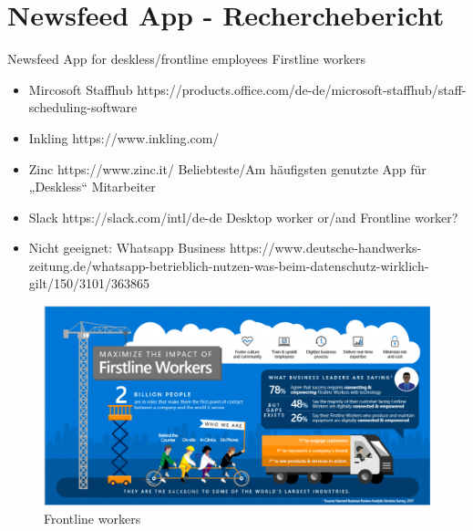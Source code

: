 \section{Newsfeed App - Recherchebericht}
\label{section:realisation:newsfeed_app}


Newsfeed App for deskless/frontline employees Firstline workers
\begin{itemize}
\item {Mircosoft Staffhub https://products.office.com/de-de/microsoft-staffhub/staff-scheduling-software}
\item {Inkling 	https://www.inkling.com/ }
\item {Zinc https://www.zinc.it/ Beliebteste/Am häufigsten genutzte App für „Deskless“ Mitarbeiter}
\item {Slack https://slack.com/intl/de-de Desktop worker or/and Frontline worker?}
\item {Nicht geeignet: Whatsapp Business https://www.deutsche-handwerks-zeitung.de/whatsapp-betrieblich-nutzen-was-beim-datenschutz-wirklich-gilt/150/3101/363865}
\end{itemize}

\begin{figure}[H] 
\centering 
\includegraphics[scale=0.48]{images/frontlineworkers} 
\caption[Frontline Workers]{Frontline workers\protect} 
\label{dem} 
\end{figure}

